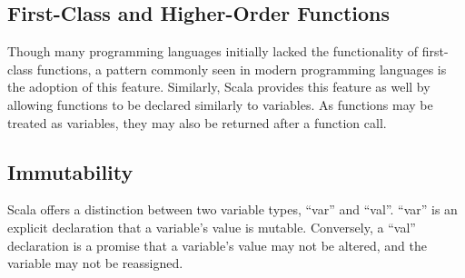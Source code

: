 \documentclass[12pt]{report}
\begin{document}
\subsection*{First-Class and Higher-Order Functions}
Though many programming languages initially lacked the functionality of first-class functions, a pattern commonly seen in modern programming languages is the adoption of this feature. Similarly, Scala provides this feature as well by allowing functions to be declared similarly to variables. As functions may be treated as variables, they may also be returned after a function call. 

\subsection*{Immutability} 
Scala offers a distinction between two variable types, “var” and “val”. “var” is an explicit declaration that a variable’s value is mutable. Conversely, a “val” declaration is a promise that a variable’s value may not be altered, and the variable may not be reassigned. \\
\\  
\end{document}

